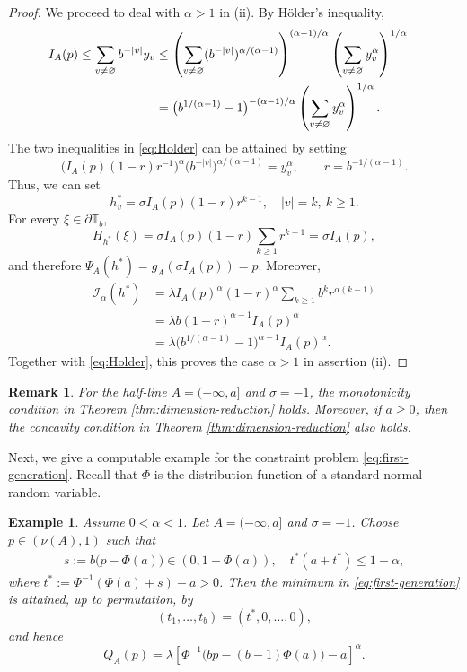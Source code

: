 \documentclass[a4paper, 11pt]{article}
\newcommand{\1}{\mathbf 1}
\theoremstyle{plain}
\newtheorem{remark}{Remark}[section]
\newtheorem{example}{Example}[section]
\begin{document}
\begin{proof}
\par
We proceed to deal with \(\alpha>1\) in (ii). By H\"older's inequality,
\begin{align}\label{eq:Holder}
  I_A(p)
  \le\sum_{v\ne\varnothing}b^{-\lvert v\rvert}y_v&\le\left(\sum_{v\ne\varnothing}
       (b^{-\lvert v\rvert})^{\alpha/(\alpha-1)}\right)^{(\alpha-1)/\alpha}
       \left(\sum_{v\ne\varnothing}y_v^\alpha\right)^{1/\alpha}\cr
  &=\bigl(b^{1/(\alpha-1)}-1\bigr)^{-(\alpha-1)/\alpha}
       \left(\sum_{v\ne\varnothing}y_v^\alpha\right)^{1/\alpha}.
\end{align}
The two inequalities in \eqref{eq:Holder} can be attained by setting
\[
  \bigl(I_A(p)(1-r)r^{-1}\bigr)^\alpha
  \bigl(b^{-\lvert v\rvert}\bigr)^{\alpha/(\alpha-1)}=y_v^\alpha,
  \qquad r=b^{-1/(\alpha-1)}.
\]
Thus, we can set
\[
  h_v^*=\sigma I_A(p)(1-r)r^{k-1},
  \quad |v|=k,~k\geq1.
\]
For every \(\xi\in\partial\mathbb{T}_b\),
\[
  H_{h^*}(\xi)
  =\sigma I_A(p)(1-r)\sum_{k\geq1}r^{k-1}
  =\sigma I_A(p),
\]
and therefore \(\Psi_A(h^*)=g_A(\sigma I_A(p))=p\). Moreover,
\begin{align*}
  \mathcal{I_{\alpha}}(h^*)
  &=\lambda I_A(p)^\alpha(1-r)^\alpha
    \sum_{k\geq1}b^k r^{\alpha(k-1)}\\
  &=\lambda b(1-r)^{\alpha-1}I_A(p)^\alpha\\
  &=\lambda\bigl(b^{1/(\alpha-1)}-1\bigr)^{\alpha-1}
    I_A(p)^\alpha.
\end{align*}
Together with \eqref{eq:Holder}, this proves the case \(\alpha>1\) in assertion \textup{(ii)}.
\end{proof}
\begin{remark}
For the half-line \(A=(-\infty,a]\) and $\sigma=-1$,
the monotonicity condition in Theorem \ref{thm:dimension-reduction} holds. Moreover, if $a\geq 0$, then the concavity condition in Theorem \ref{thm:dimension-reduction} also holds.
\end{remark}
Next, we give a computable example for the constraint problem \eqref{eq:first-generation}.
Recall that $\Phi$ is the distribution function of a standard normal random variable.
\begin{example}\label{5tre6yy6yu}
Assume \(0<\alpha<1\). Let \(A=(-\infty,a]\) and \(\sigma=-1\). Choose \(p\in(\nu(A),1)\) such that
\begin{align}\label{43thy6yy6}
  s:=b\bigl(p-\Phi(a)\bigr)\in (0,1-\Phi(a)),
  \quad
    t^{*}(a+t^{*})\le 1-\alpha,
\end{align}
where \(t^{*}:=\Phi^{-1}(\Phi(a)+s)-a>0\). Then the minimum in
\eqref{eq:first-generation} is attained, up to
permutation, by
\[
  (t_1,\ldots,t_b)=(t^{*},0,\ldots,0),
\]
and hence
\begin{equation}\label{eq:halfline-computable-formula}
  Q_A(p)
  =\lambda\left[
    \Phi^{-1}\bigl(bp-(b-1)\Phi(a)\bigr)-a
  \right]^\alpha.
\end{equation}
\end{example}
\end{document}
